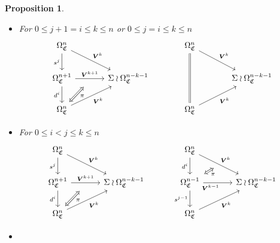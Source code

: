 \documentclass[a4paper,10pt
,draft
]{article}%
\numberwithin{equation}{section}
\numberwithin{figure}{section}
\newtheorem{proposition}[equation]{Proposition}%
\theoremstyle{definition} %
\newcommand{\1}{\ensuremath{\mathbbm 1}}%
\begin{document}
\begin{proposition}
\begin{itemize}
\begin{equation}
\begin{tikzcd}[row sep = 20pt, column sep = 35pt]
,swap,"\pi"
]
\arrow[Leftrightarrow, from=VVV, to=UUU,shorten >=0.05cm,shorten <=0.05cm
,swap,"\pi"
]
\end{tikzcd}
\end{equation}
\item[(DF2)]
For $0 \leq j+1 = i \leq k \leq n$ or 
$0 \leq j = i \leq k \leq n$
\begin{equation}
\begin{tikzcd}[row sep = 20pt, column sep = 35pt]
	\Omega^n_{\mathfrak{C}}
	\arrow{dr}[swap,name=U]{}{\boldsymbol{V}^k} \arrow{d}[swap]{s^j} &
&
	\Omega^n_{\mathfrak{C}}
	\arrow{dr}[swap,name=UUU]{}{\boldsymbol{V}^k} \arrow[equal]{dd} &
\\
	|[alias=V]|
	\Omega^{n+1}_{\mathfrak{C}} \ar{r}{\boldsymbol{V}^{k+1}}[swap,name=UU]{} \arrow{d}[swap]{d^i}&
	\Sigma \wr \Omega^{n-k-1}_{\mathfrak{C}}
&
	&
	\Sigma \wr \Omega^{n-k-1}_{\mathfrak{C}}
\\
	|[alias=VV]|
	\Omega^{n}_{\mathfrak{C}} \arrow{ur}[swap]{\boldsymbol{V}^k} &
&
	|[alias=VVVV]|
	\Omega^{n}_{\mathfrak{C}} \arrow{ur}[swap]{\boldsymbol{V}^k} &
\arrow[Leftrightarrow, from=VV, to=UU,shorten >=0.25cm,shorten <=0.05cm
,swap,"\pi"
]
\end{tikzcd}
\end{equation}
\item[(DF3)]
For $0\leq i < j \leq k \leq n$
\begin{equation}
\begin{tikzcd}[row sep = 20pt, column sep = 35pt]
	\Omega^n_{\mathfrak{C}}
	\arrow{dr}[swap,name=U]{}{\boldsymbol{V}^k} \arrow{d}[swap]{s^j} &
&
	\Omega^n_{\mathfrak{C}}
	\arrow{dr}[swap,name=UUU]{}{\boldsymbol{V}^k} \arrow{d}[swap]{d^{i}} &
\\
	|[alias=V]|
	\Omega^{n+1}_{\mathfrak{C}} \ar{r}{\boldsymbol{V}^{k+1}}[swap,name=UU]{} \arrow{d}[swap]{d^i}&
	\Sigma \wr \Omega^{n-k-1}_{\mathfrak{C}}
&
	|[alias=VVV]|
	\Omega^{n-1}_{\mathfrak{C}} \ar{r}[near start, swap]{\boldsymbol{V}^{k-1}}[swap,name=UUUU]{} \ar{d}[swap]{s^{j-1}} &
	\Sigma \wr \Omega^{n-k-1}_{\mathfrak{C}}
\\
	|[alias=VV]|
	\Omega^{n}_{\mathfrak{C}} \arrow{ur}[swap]{\boldsymbol{V}^k} &
&
	|[alias=VVVV]|
	\Omega^{n}_{\mathfrak{C}} \arrow{ur}[swap]{\boldsymbol{V}^k} &
\arrow[Leftrightarrow, from=VV, to=UU,shorten >=0.25cm,shorten <=0.05cm
,swap,"\pi"
]
\arrow[Leftrightarrow, from=VVV, to=UUU,shorten >=0.05cm,shorten <=0.05cm
,swap,"\pi"
]
\end{tikzcd}
\end{equation}
\item[(DF4)]

\end{itemize}
\end{proposition}
\end{document}
